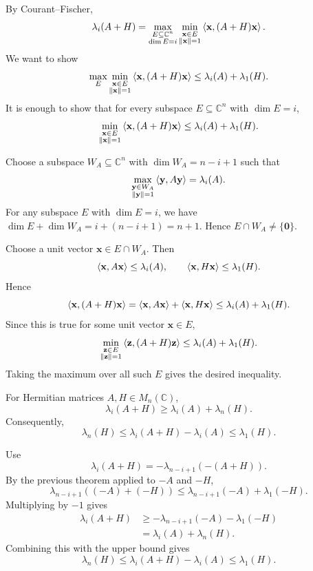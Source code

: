 \begin{pfbox}
By Courant--Fischer,
\[
    \lambda_i(A+H)
    =
    \max_{\substack{E\subseteq \mathbb{C}^n \\ \dim E=i}}
    \min_{\substack{\mathbf{x}\in E \\ \left\lVert \mathbf{x} \right\rVert=1}}
    \left\langle \mathbf{x}, (A+H)\mathbf{x} \right\rangle.
\]
We want to show
\[
    \max_E
    \min_{\substack{\mathbf{x}\in E \\ \left\lVert \mathbf{x} \right\rVert=1}}
    \left\langle \mathbf{x}, (A+H)\mathbf{x} \right\rangle
    \le
    \lambda_i(A)+\lambda_1(H).
\]
It is enough to show that for every subspace $E\subseteq\mathbb{C}^n$ with
$\dim E=i$,
\[
    \min_{\substack{\mathbf{x}\in E \\ \left\lVert \mathbf{x} \right\rVert=1}}
    \left\langle \mathbf{x}, (A+H)\mathbf{x} \right\rangle
    \le
    \lambda_i(A)+\lambda_1(H).
\]

Choose a subspace $W_A\subseteq\mathbb{C}^n$ with $\dim W_A=n-i+1$ such that
\[
    \max_{\substack{\mathbf{y}\in W_A \\ \left\lVert \mathbf{y} \right\rVert=1}}
    \left\langle \mathbf{y}, A\mathbf{y} \right\rangle
    =
    \lambda_i(A).
\]
For any subspace $E$ with $\dim E=i$, we have
$\dim E+\dim W_A=i+(n-i+1)=n+1$. Hence $E\cap W_A\neq\{\mathbf{0}\}$.

Choose a unit vector $\mathbf{x}\in E\cap W_A$. Then
\[
    \left\langle \mathbf{x}, A\mathbf{x} \right\rangle
    \le
    \lambda_i(A),
    \qquad
    \left\langle \mathbf{x}, H\mathbf{x} \right\rangle
    \le
    \lambda_1(H).
\]
Hence
\[
    \left\langle \mathbf{x}, (A+H)\mathbf{x} \right\rangle
    =
    \left\langle \mathbf{x}, A\mathbf{x} \right\rangle
    +
    \left\langle \mathbf{x}, H\mathbf{x} \right\rangle
    \le
    \lambda_i(A)+\lambda_1(H).
\]
Since this is true for some unit vector $\mathbf{x}\in E$,
\[
    \min_{\substack{\mathbf{z}\in E \\ \left\lVert \mathbf{z} \right\rVert=1}}
    \left\langle \mathbf{z}, (A+H)\mathbf{z} \right\rangle
    \le
    \lambda_i(A)+\lambda_1(H).
\]
Taking the maximum over all such $E$ gives the desired inequality.
\end{pfbox}


\begin{corollary}
For Hermitian matrices $A,H\in M_n(\mathbb{C})$,
\[
    \lambda_i(A+H)
    \ge
    \lambda_i(A)+\lambda_n(H).
\]
Consequently,
\[
    \lambda_n(H)
    \le
    \lambda_i(A+H)-\lambda_i(A)
    \le
    \lambda_1(H).
\]
\end{corollary}

\begin{pfbox}
Use
\[
    \lambda_i(A+H)
    =
    -\lambda_{n-i+1}(-(A+H)).
\]
By the previous theorem applied to $-A$ and $-H$,
\[
    \lambda_{n-i+1}((-A)+(-H))
    \le
    \lambda_{n-i+1}(-A)+\lambda_1(-H).
\]
Multiplying by $-1$ gives
\begin{align*}
    \lambda_i(A+H)
    &\ge
    -\lambda_{n-i+1}(-A)-\lambda_1(-H)                                  \\
    &=
    \lambda_i(A)+\lambda_n(H).
\end{align*}
Combining this with the upper bound gives
\[
    \lambda_n(H)
    \le
    \lambda_i(A+H)-\lambda_i(A)
    \le
    \lambda_1(H).
\]
\end{pfbox}



